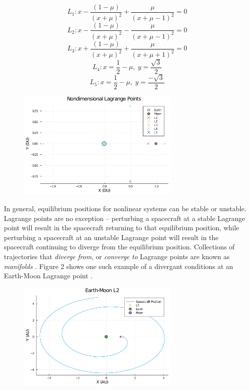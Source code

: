 \documentclass[conf]{new-aiaa}
\begin{document}
\begin{multicols}{2}
\begin{equation}
    L_1: x - \frac{(1-\mu)}{(x+\mu)^2} + \frac{\mu}{(x + \mu - 1)^2} = 0
\end{equation}
\begin{equation}
    L_2: x - \frac{(1 - \mu)}{(x + \mu)^2} - \frac{\mu}{(x + \mu - 1)^2} = 0
\end{equation}
\begin{equation}
    L_3: x + \frac{(1-\mu)}{(x+\mu)^2} + \frac{\mu}{(x + \mu + 1)^2} = 0
\end{equation}
\begin{equation}
    L_4: x = \frac{1}{2} - \mu,\; y = \frac{\sqrt{3}}{2}
\end{equation}
\begin{equation}
    L_5: x = \frac{1}{2} - \mu,\; y = \frac{-\sqrt{3}}{2}
\end{equation}
    
\begin{figure}[H]
    \includegraphics[width=8cm]{fig1}
    \centering
\end{figure}

In general, equilibrium positions for nonlinear systems can be stable or unstable. 
Lagrange points are no exception -- perturbing a spacecraft at a stable Lagrange point 
will result in the spacecraft returning to that equilibrium position, while perturbing 
a spacecraft at an unstable Lagrange point will result in the spacecraft continuing to 
diverge from the equilibrium position. Collections of trajectories that 
\textit{diverge from}, or \textit{converge to} Lagrange points are known as 
\textit{manifolds} \cite{rund2018interplanetary}. Figure 2 shows one such example of a 
divergant conditions at an Earth-Moon Lagrange point \cite{rund2018interplanetary}.

\begin{figure}[H]
    \includegraphics[width=8cm]{fig2}
    \centering
\end{figure}


\end{multicols}
\end{document}
